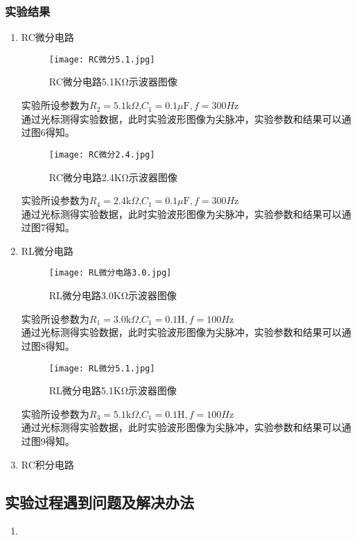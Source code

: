 \documentclass[dvipsnames, svgnames,a4paper,11pt]{article}
\begin{document}
	\subsubsection{实验结果}
	\begin{enumerate}
\item RC微分电路
\begin{figure}[{H}]
	\centering
	\texttt{[image: RC微分5.1.jpg]}
	\caption{RC微分电路5.1KΩ示波器图像}
	\label{}
\end{figure}
实验所设参数为$R_2=5.1\text{k}\Omega\text{,}C_1=0.1\mu\text{F},f=300H\text{z}$\\
\indent 通过光标测得实验数据，此时实验波形图像为尖脉冲，实验参数和结果可以通过图6得知。

\begin{figure}[{H}]
	\centering
	\texttt{[image: RC微分2.4.jpg]}
	\caption{RC微分电路2.4KΩ示波器图像}
	\label{}
\end{figure}
实验所设参数为$R_4=2.4\text{k}\Omega\text{,}C_1=0.1\mu\text{F},f=300H\text{z}$\\
\indent 通过光标测得实验数据，此时实验波形图像为尖脉冲，实验参数和结果可以通过图7得知。
\item RL微分电路
\begin{figure}[{H}]
	\centering
	\texttt{[image: RL微分电路3.0.jpg]}
	\caption{RL微分电路3.0KΩ示波器图像}
	\label{}
\end{figure}
实验所设参数为$R_1=3.0\text{k}\Omega\text{,}C_1=0.1\text{H},f=100H\text{z}$\\
\indent 通过光标测得实验数据，此时实验波形图像为尖脉冲，实验参数和结果可以通过图8得知。

\begin{figure}[{H}]
	\centering
	\texttt{[image: RL微分5.1.jpg]}
	\caption{RL微分电路5.1KΩ示波器图像}
	\label{}
\end{figure}
实验所设参数为$R_3=5.1\text{k}\Omega\text{,}C_1=0.1\text{H},f=100H\text{z}$\\
\indent 通过光标测得实验数据，此时实验波形图像为尖脉冲，实验参数和结果可以通过图9得知。
\item RC积分电路
	\end{enumerate}
	
	

	\subsection{实验过程遇到问题及解决办法}
	\begin{enumerate}
		\item 
	\end{enumerate}
	
\end{document}
